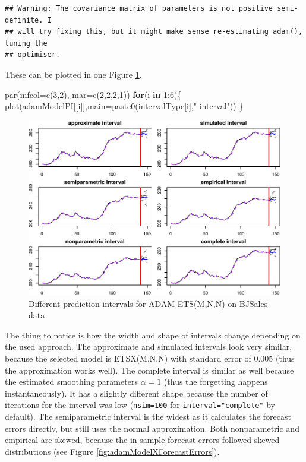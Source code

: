 \documentclass[
]{book}
\newenvironment{Shaded}{\begin{snugshade}}{\end{snugshade}}
\newcommand{\AttributeTok}[1]{\textcolor[rgb]{0.77,0.63,0.00}{#1}}
\newcommand{\ControlFlowTok}[1]{\textcolor[rgb]{0.13,0.29,0.53}{\textbf{#1}}}
\newcommand{\DecValTok}[1]{\textcolor[rgb]{0.00,0.00,0.81}{#1}}
\newcommand{\FunctionTok}[1]{\textcolor[rgb]{0.00,0.00,0.00}{#1}}
\newcommand{\NormalTok}[1]{#1}
\newcommand{\SpecialCharTok}[1]{\textcolor[rgb]{0.00,0.00,0.00}{#1}}
\newcommand{\StringTok}[1]{\textcolor[rgb]{0.31,0.60,0.02}{#1}}
\theoremstyle{definition}
\theoremstyle{definition}
\theoremstyle{definition}
\theoremstyle{definition}
\theoremstyle{remark}
\begin{document}
\begin{verbatim}
## Warning: The covariance matrix of parameters is not positive semi-definite. I
## will try fixing this, but it might make sense re-estimating adam(), tuning the
## optimiser.
\end{verbatim}

These can be plotted in one Figure \ref{fig:adamModelXPI6Plots}.

\begin{Shaded}
\begin{Highlighting}[]
\FunctionTok{par}\NormalTok{(}\AttributeTok{mfcol=}\FunctionTok{c}\NormalTok{(}\DecValTok{3}\NormalTok{,}\DecValTok{2}\NormalTok{), }\AttributeTok{mar=}\FunctionTok{c}\NormalTok{(}\DecValTok{2}\NormalTok{,}\DecValTok{2}\NormalTok{,}\DecValTok{2}\NormalTok{,}\DecValTok{1}\NormalTok{))}
\ControlFlowTok{for}\NormalTok{(i }\ControlFlowTok{in} \DecValTok{1}\SpecialCharTok{:}\DecValTok{6}\NormalTok{)\{}
  \FunctionTok{plot}\NormalTok{(adamModelPI[[i]],}\AttributeTok{main=}\FunctionTok{paste0}\NormalTok{(intervalType[i],}\StringTok{" interval"}\NormalTok{))}
\NormalTok{\}}
\end{Highlighting}
\end{Shaded}

\begin{figure}
\centering
\includegraphics{adam_files/figure-latex/adamModelXPI6Plots-1.pdf}
\caption{\label{fig:adamModelXPI6Plots}Different prediction intervals for ADAM ETS(M,N,N) on BJSales data}
\end{figure}

The thing to notice is how the width and shape of intervals change depending on the used approach. The approximate and simulated intervals look very similar, because the selected model is ETSX(M,N,N) with standard error of 0.005 (thus the approximation works well). The complete interval is similar as well because the estimated smoothing parameters \(\alpha=1\) (thus the forgetting happens instantaneously). It has a slightly different shape because the number of iterations for the interval was low (\texttt{nsim=100} for \texttt{interval="complete"} by default). The semiparametric interval is the widest as it calculates the forecast errors directly, but still uses the normal approximation. Both nonparametric and empirical are skewed, because the in-sample forecast errors followed skewed distributions (see Figure \ref{fig:adamModelXForecastErrors}).
\end{document}
